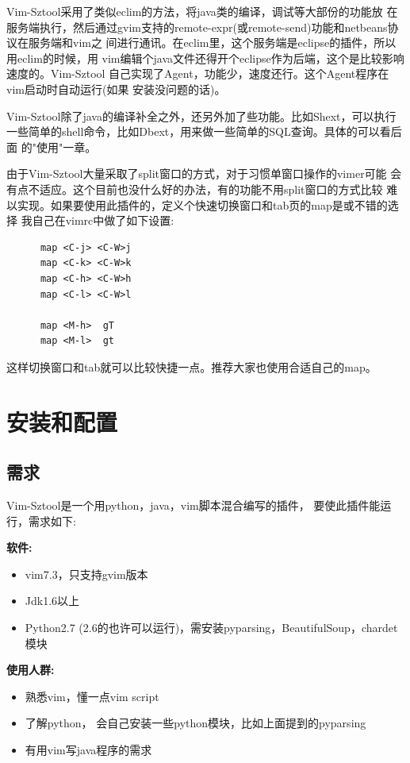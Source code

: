\documentclass[oneside,openany]{book}
\begin{document}
  Vim-Sztool采用了类似eclim的方法，将java类的编译，调试等大部份的功能放
在服务端执行，然后通过gvim支持的remote-expr(或remote-send)功能和netbeans协议在服务端和vim之
间进行通讯。在eclim里，这个服务端是eclipse的插件，所以用eclim的时候，用
vim编辑个java文件还得开个eclipse作为后端，这个是比较影响速度的。Vim-Sztool
自己实现了Agent，功能少，速度还行。这个Agent程序在vim启动时自动运行(如果
安装没问题的话)。

  Vim-Sztool除了java的编译补全之外，还另外加了些功能。比如Shext，可以执行
一些简单的shell命令，比如Dbext，用来做一些简单的SQL查询。具体的可以看后面
的"使用"一章。

  由于Vim-Sztool大量采取了split窗口的方式，对于习惯单窗口操作的vimer可能
会有点不适应。这个目前也没什么好的办法，有的功能不用split窗口的方式比较
难以实现。如果要使用此插件的，定义个快速切换窗口和tab页的map是或不错的选择
我自己在vimrc中做了如下设置:

\begin{mdframed}[style=BestPracticeFrame]
    \begin{verbatim}
      map <C-j> <C-W>j
      map <C-k> <C-W>k
      map <C-h> <C-W>h
      map <C-l> <C-W>l

      map <M-h>  gT
      map <M-l>  gt
    \end{verbatim}
\end{mdframed}

这样切换窗口和tab就可以比较快捷一点。推荐大家也使用合适自己的map。


\chapter{安装和配置}
  \section{需求}
  Vim-Sztool是一个用python，java，vim脚本混合编写的插件， 要使此插件能运行，需求如下:

  \textbf{软件:}
    \begin{itemize}
      \item vim7.3，只支持gvim版本
      \item Jdk1.6以上
      \item Python2.7 (2.6的也许可以运行)，需安装pyparsing，BeautifulSoup，chardet模块
    \end{itemize}

  \textbf{使用人群:}
    \begin{itemize}
      \item 熟悉vim，懂一点vim script
      \item 了解python， 会自己安装一些python模块，比如上面提到的pyparsing
      \item 有用vim写java程序的需求
    \end{itemize}
\end{document}
